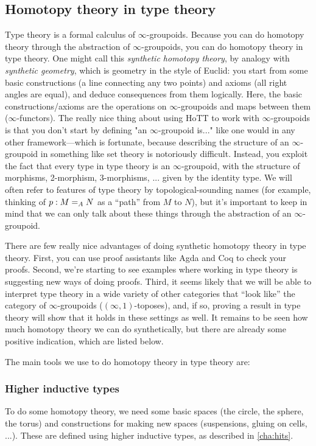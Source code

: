 \subsection{Homotopy theory in type theory}

Type theory is a formal calculus of $\infty$-groupoids. Because you can
do homotopy theory through the abstraction of $\infty$-groupoids, you
can do homotopy theory in type theory.  One might call this
\emph{synthetic homotopy theory}, by analogy with \emph{synthetic
  geometry}, which is geometry in the style of Euclid: you start from
some basic constructions (a line connecting any two points) and axioms
(all right angles are equal), and deduce consequences from them
logically.  Here, the basic constructions/axioms are the operations on
$\infty$-groupoids and maps between them ($\infty$-functors).  The
really nice thing about using HoTT to work with $\infty$-groupoids is
that you don't start by defining "an $\infty$-groupoid is..." like one
would in any other framework---which is fortunate, because describing
the structure of an $\infty$-groupoid in something like set theory is
notoriously difficult.  Instead, you exploit the fact that every type in
type theory is an $\infty$-groupoid, with the structure of morphisms,
2-morphism, 3-morphisms, ... given by the identity type.  We will often
refer to features of type theory by topological-sounding names (for
example, thinking of $p : \id[A] M N$ as a ``path'' from $M$ to $N$),
but it's important to keep in mind that we can only talk about these
things through the abstraction of an $\infty$-groupoid.

There are few really nice advantages of doing synthetic homotopy theory
in type theory.  First, you can use proof assistants like Agda and Coq
to check your proofs.  Second, we're starting to see examples where
working in type theory is suggesting new ways of doing proofs.  Third,
it seems likely that we will be able to interpret type theory in a wide
variety of other categories that ``look like'' the category of
$\infty$-groupoids ($(\infty,1)$-toposes), and, if so, proving a result
in type theory will show that it holds in these settings as well. It
remains to be seen how much homotopy theory we can do synthetically, but
there are already some positive indication, which are listed below.

The main tools we use to do homotopy theory in type theory are:

\subsubsection{Higher inductive types} To do some homotopy theory, we need some
  basic spaces (the circle, the sphere, the torus) and constructions for
  making new spaces (suspensions, gluing on cells, ...).  These are
  defined using higher inductive types, as described in
  \autoref{cha:hits}.

